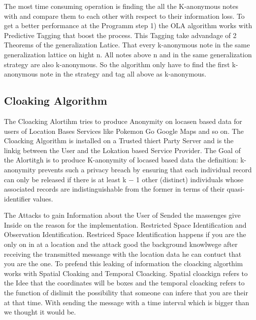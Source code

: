 \documentclass{llncs}
\begin{document}
The most time consuming operation is finding the all the K-anonymous notes with and compare them to each other with respect to their information loss.  To get a better performance at the Programm step 1) the OLA algorithm works with Predictive Tagging that boost the process.  This Tagging take advandage of 2 Theorems of the generalization Latice. That every k-anonymous note in the same generalization lattice on hight n. All notes above n and in the same generalization strategy are also k-anonymous. So the algorithm only have to find the first k-anonymous note in the strategy and tag all above as k-anonymous. 

\subsection{Cloaking Algorithm}
The Cloacking Alortihm tries to produce Anonymity on locasen based data for users of Location Bases Services like Pokemon Go Google Maps and so on. The Cloacking Algorithm is installed on a Trusted thiert Party Server and is the linkig between the User and the Lokation based Service Provider. The Goal of the Alortitgh is to produce K-anonymity of locased based data the definition: k-anonymity prevents such a privacy breach by ensuring that each individual record can only be released if there is at least k − 1 other (distinct) individuals whose associated records are indistinguishable from the former in terms of their quasi-identifier values.

The Attacks to gain Information about the User of Sended the massenges give Inside on the reason for the implementation. Restricted Space Identiﬁcation and Observation Identiﬁcation. Restriced Space Identification happens if you are the only on in at a location and the attack good the background knowlwege after receiving the transmitted messange with the location data he can contuct that you are the one. To prefend this leaking of information the cloacking algorthim works with Spatial Cloaking and Temporal Cloacking. Spatial cloackign refers to the Idee that the coordinates will be boxes and the temporal cloacking refers to the function of dislimit the possibility that someone can infere that you are their at that time. With sending the message with a time interval which is bigger than we thought it would be. 

\end{document}
